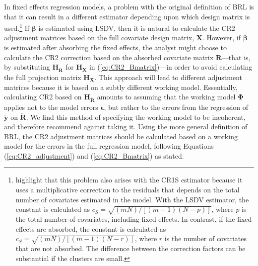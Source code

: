 \documentclass[12pt]{article}\usepackage[]{graphicx}\usepackage[]{color}
\newcommand{\bm}{\mathbf}
\newcommand{\bs}{\boldsymbol}
\begin{document}
In fixed effects regression models, a problem with the original definition of BRL is that it can result in a different estimator depending upon which design matrix is used.\footnote{ 
\citet{Cameron2015practitioners} highlight that this problem also arises with the CR1S estimator because it uses a multiplicative correction to the residuals that depends on the total number of covariates estimated in the model. 
With the LSDV estimator, the constant is calculated as $c_S = \sqrt{(mN) / [(m - 1)(N - p)]}$, where $p$ is the total number of covariates, including fixed effects. 
In contrast, if the fixed effects are absorbed, the constant is calculated as $c_S = \sqrt{(mN) / [(m - 1)(N - r)]}$, where $r$ is the number of covariates that are not absorbed. 
The difference between the correction factors can be substantial if the clusters are small.}
If $\bs\beta$ is estimated using LSDV, then it is natural to calculate the CR2 adjustment matrices based on the full covariate design matrix, $\bm{X}$. However, if $\bs\beta$ is estimated after absorbing the fixed effects, the analyst might choose to calculate the CR2 correction based on the absorbed covariate matrix $\bm{\ddot{R}}$---that is, by substituting $\bm{H_{\ddot{R}}}$ for $\bm{H_X}$ in (\ref{eq:CR2_Bmatrix})---in order to avoid calculating the full projection matrix $\bm{H_X}$. 
This approach will lead to different adjustment matrices because it is based on a subtly different working model. 
Essentially, calculating CR2 based on $\bm{H_{\ddot{R}}}$ amounts to assuming that the working model $\bs\Phi$ applies not to the model errors $\bs\epsilon$, but rather to the errors from the regression of $\bm{\ddot{y}}$ on $\bm{\ddot{R}}$.
We find this method of specifying the working model to be incoherent, and therefore recommend against taking it.
Using the more general definition of BRL, the CR2 adjustment matrices should be calculated based on a working model for the errors in the full regression model, following Equations (\ref{eq:CR2_adjustment}) and (\ref{eq:CR2_Bmatrix}) as stated. 
\end{document}

